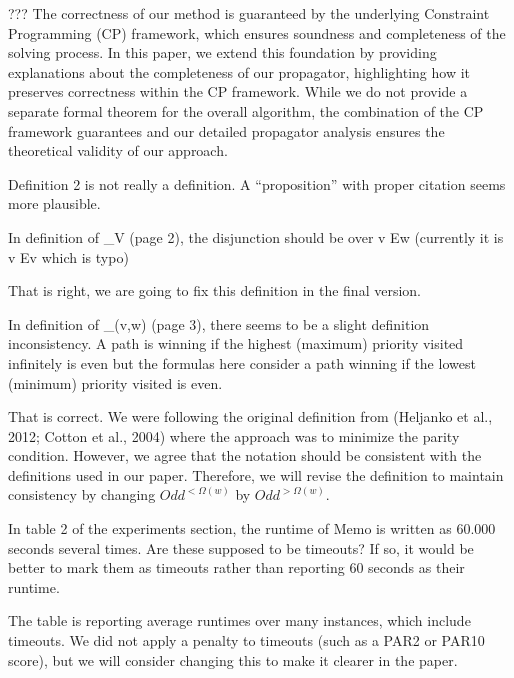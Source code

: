 \documentclass{article}
\begin{document}
???
The correctness of our method is guaranteed by the underlying Constraint Programming (CP) framework, which ensures soundness and completeness of the solving process. In this paper, we extend this foundation by providing explanations about the completeness of our propagator, highlighting how it preserves correctness within the CP framework. While we do not provide a separate formal theorem for the overall algorithm, the combination of the CP framework guarantees and our detailed propagator analysis ensures the theoretical validity of our approach.

\begin{reviewer}
Definition 2 is not really a definition. A “proposition” with proper citation seems more plausible.
\end{reviewer}

\begin{reviewer}
In definition of \Phi_V (page 2), the disjunction should be over v \in Ew (currently it is v \in Ev which is typo)
\end{reviewer}

That is right, we are going to fix this definition in the final version.

\begin{reviewer}
In definition of \Psi_{(v,w)} (page 3), there seems to be a slight definition inconsistency. A path is winning if the highest (maximum) priority visited infinitely is even but the formulas here consider a path winning if the lowest (minimum) priority visited is even.
\end{reviewer}

That is correct. We were following the original definition from (Heljanko et al., 2012; Cotton et al., 2004) where the approach was to minimize the parity condition. However, we agree that the notation should be consistent with the definitions used in our paper. Therefore, we will revise the definition to maintain consistency by changing $Odd^{<\Omega(w)}$ by $Odd^{>\Omega(w)}$.

\begin{reviewer}
In table 2 of the experiments section, the runtime of Memo is written as 60.000 seconds several times. Are these supposed to be timeouts? If so, it would be better to mark them as timeouts rather than reporting 60 seconds as their runtime.
\end{reviewer}

The table is reporting average runtimes over many instances, which include timeouts. We did not apply a penalty to timeouts (such as a PAR2 or PAR10 score), but we will consider changing this to make it clearer in the paper.
\end{document}
